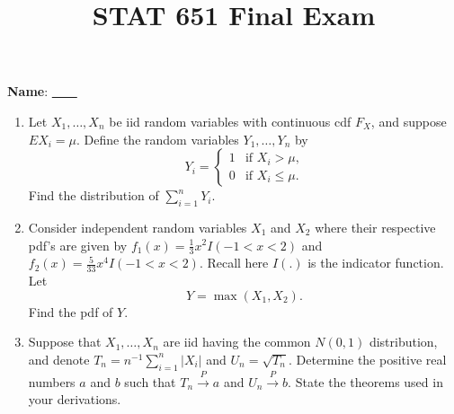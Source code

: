\documentclass[12pt]{article}
\begin{document}
\title{STAT 651 Final Exam}
\author{}
\maketitle

\textbf{Name}: \underline{\ \ \hskip8cm\ \ }
\medskip

\begin{enumerate}
\item Let $X_1,\dotsc,X_n$ be iid random variables with continuous cdf
$F_X$, and suppose $EX_i = \mu$.
Define the random variables $Y_1,\dotsc,Y_n$ by
\[
Y_i = \begin{cases}
        1 & \text{if $X_i > \mu$,} \\
        0 & \text{if $X_i \le \mu$.}
    \end{cases}
\]
Find the distribution of $\sum_{i=1}^n Y_i$.

\item
Consider independent random variables
$X_1$ and $X_2$ where their respective pdf's are given by
$f_1(x) = \frac{1}{3}x^2 I(-1 < x < 2)$ and
$f_2(x) = \frac{5}{33}x^4 I(-1 < x < 2)$.
Recall here $I(.)$ is the indicator function.
Let
\[
Y = \max(X_1, X_2).
\]
Find the pdf of $Y$.

\item
Suppose that $X_1,\dotsc,X_n$ are iid having the common $N(0,1)$
distribution, and denote $T_n = n^{-1}\sum_{i=1}^n |X_i|$
and $U_n = \sqrt{T_n}$.
Determine the positive real numbers $a$ and $b$ such that
$T_n \xrightarrow{\;P\;} a$ and $U_n \xrightarrow{\;P\;} b$.
State the theorems used in your derivations.
\end{enumerate}
\end{document}
